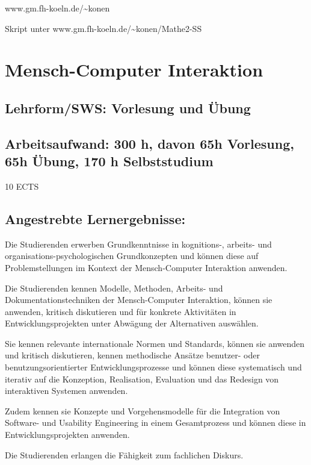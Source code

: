 www.gm.fh-koeln.de/\textasciitilde{}konen

Skript unter www.gm.fh-koeln.de/\textasciitilde{}konen/Mathe2-SS

\chapter{Mensch-Computer Interaktion}\label{mensch-computer-interaktion}

\section{Lehrform/SWS: Vorlesung und
Übung}\label{lehrformsws-vorlesung-und-uxfcbung}

\section{Arbeitsaufwand: 300 h, davon 65h Vorlesung, 65h Übung, 170 h
Selbststudium}\label{arbeitsaufwand-300-h-davon-65h-vorlesung-65h-uxfcbung-170-h-selbststudium}

10 ECTS

\section{Angestrebte
Lernergebnisse:}\label{angestrebte-lernergebnisse-15}

Die Studierenden erwerben Grundkenntnisse in kognitions-, arbeits- und
organisations-psychologischen Grundkonzepten und können diese auf
Problemstellungen im Kontext der Mensch-Computer Interaktion anwenden.

Die Studierenden kennen Modelle, Methoden, Arbeits- und
Dokumentationstechniken der Mensch-Computer Interaktion, können sie
anwenden, kritisch diskutieren und für konkrete Aktivitäten in
Entwicklungsprojekten unter Abwägung der Alternativen auswählen.

Sie kennen relevante internationale Normen und Standards, können sie
anwenden und kritisch diskutieren, kennen methodische Ansätze benutzer-
oder benutzungsorientierter Entwicklungsprozesse und können diese
systematisch und iterativ auf die Konzeption, Realisation, Evaluation
und das Redesign von interaktiven Systemen anwenden.

Zudem kennen sie Konzepte und Vorgehensmodelle für die Integration von
Software- und Usability Engineering in einem Gesamtprozess und können
diese in Entwicklungsprojekten anwenden.

Die Studierenden erlangen die Fähigkeit zum fachlichen Diskurs.

